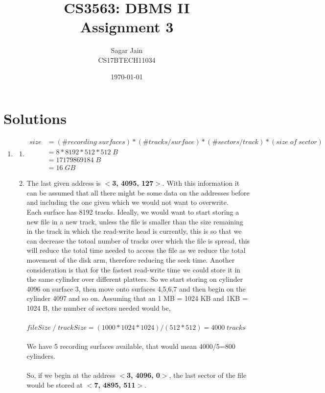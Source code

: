 \documentclass[12pt]{article}
\begin{document}
\title{CS3563: DBMS II\\Assignment 3}
\author{Sagar Jain\\CS17BTECH11034}
\date{\AdvanceDate[-1]\today}
\maketitle
\section{Solutions}
\begin{enumerate}
\item
\begin{enumerate}
\item  
\begin{align*}
	size &= (\# recording\;surfaces) * (\#tracks/surface) * (\#sectors/track)*(size\;of\;sector)\\
	&= 8 * 8192 * 512 * 512\;B\\
	&= 17179869184\;B \\
	&= 16 \;GB
\end{align*}
\item The last given address is \textbf{$<$3, 4095, 127$>$}. With this information it can be assumed that all there might be some data on the addresses before and including the one given which we would not want to overwrite.\\
Each surface has 8192 tracks. Ideally, we would want to start storing a new file in a new track, unless the file is smaller than the size remaining in the track in which the read-write head is currently, this is so that we can decrease the totoal number of tracks over which the file is spread, this will reduce the total time needed to access the file as we reduce the total movement of the disk arm, therefore reducing the seek time. Another consideration is that for the fastest read-write time we could store it in the same cylinder over different platters. So we start storing on cylinder 4096 on surface 3, then move onto surfaces 4,5,6,7 and then begin on the cylinder 4097 and so on.
Assuming that an 1 MB = 1024 KB and 1KB = 1024 B, the number of sectors needed would be,\\\\
$ fileSize\;/\;trackSize = (1000*1024*1024)/(512*512)= 4000\; tracks$\\\\
We have 5 recording surfaces available, that would mean 4000/5=800 cylinders.\\
\\So, if we begin at the address \textbf{$<$3, 4096, 0$>$}, the last sector of the file would be stored at \textbf{$<$7, 4895, 511$>$}.

\end{enumerate}
\end{enumerate}
\end{document}

